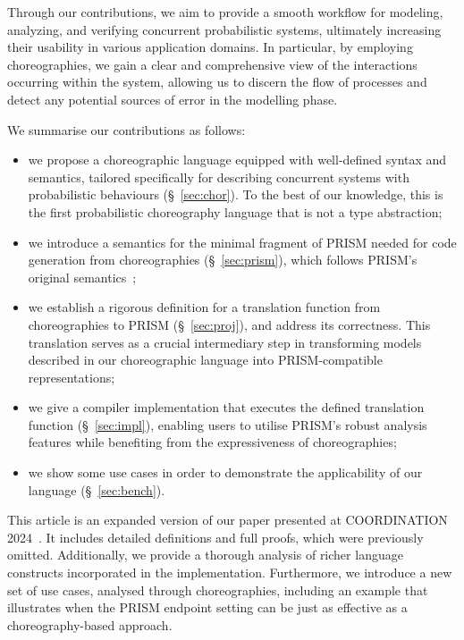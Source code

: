 Through our contributions, we aim to provide a smooth workflow for
modeling, analyzing, and verifying concurrent probabilistic systems,
ultimately increasing their usability in various application domains.
%
In particular, by employing choreographies, we gain a clear and
comprehensive view of the interactions occurring within the system,
allowing us to discern the flow of processes and detect any potential
sources of error in the modelling phase.


 We summarise our contributions as
follows:
\begin{itemize} 
\item we propose a choreographic language equipped with well-defined
  syntax and semantics, tailored specifically for describing
  concurrent systems with probabilistic behaviours
  (\S~\ref{sec:chor}). To the best of our knowledge, this is the first
  probabilistic choreography language that is not a type abstraction;

\item we introduce a semantics for the minimal fragment of PRISM
  needed for code generation from choreographies (\S~\ref{sec:prism}),
  which follows PRISM's original semantics~\cite{PRISMdoc};

\item we establish a rigorous definition for a translation function
  from choreographies to PRISM (\S~\ref{sec:proj}), and address its
  correctness. This translation serves as a crucial intermediary step
  in transforming models described in our choreographic language into
  PRISM-compatible representations;

\item we give a compiler implementation that executes the defined
  translation function (\S~\ref{sec:impl}),
  enabling users to utilise PRISM's robust analysis features while
  benefiting from the expressiveness of choreographies;

\item we show some use cases in order to demonstrate the applicability
  of our language (\S~\ref{sec:bench}).
\end{itemize}

%
This article is an expanded version of our paper presented at
COORDINATION 2024~\cite{CV24}. It includes detailed definitions and
full proofs, which were previously omitted. Additionally, we provide a
thorough analysis of richer language constructs incorporated in the
implementation. Furthermore, we introduce a new set of use cases,
analysed through choreographies, including an example that illustrates
when the PRISM endpoint setting can be just as effective as a
choreography-based approach.


